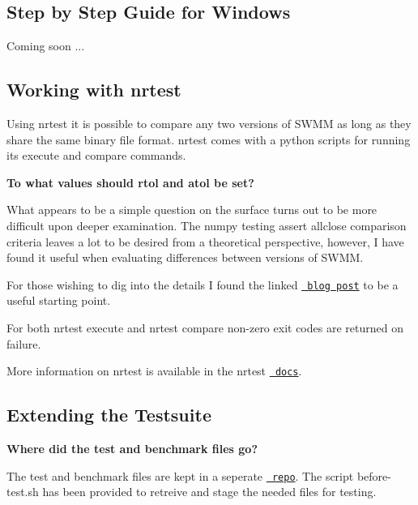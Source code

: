 \subsection*{Step by Step Guide for Windows}

Coming soon ...

\subsection*{Working with nrtest}

Using {\ttfamily nrtest} it is possible to compare any two versions of S\+W\+MM as long as they share the same binary file format. {\ttfamily nrtest} comes with a python scripts for running its {\ttfamily execute} and {\ttfamily compare} commands. 
\begin{DoxyCode}{0}
\end{DoxyCode}


{\bfseries{To what values should rtol and atol be set?}}

What appears to be a simple question on the surface turns out to be more difficult upon deeper examination. The numpy testing assert allclose comparison criteria leaves a lot to be desired from a theoretical perspective, however, I have found it useful when evaluating differences between versions of S\+W\+MM.

For those wishing to dig into the details I found the linked \href{https://randomascii.wordpress.com/2012/02/25/comparing-floating-point-numbers-2012-edition/}{\texttt{ blog post}} to be a useful starting point.

For both nrtest execute and nrtest compare non-\/zero exit codes are returned on failure.

More information on nrtest is available in the nrtest \href{https://nrtest.readthedocs.io/en/latest/}{\texttt{ docs}}.

\subsection*{Extending the Testsuite}

{\bfseries{Where did the test and benchmark files go?}}

The test and benchmark files are kept in a seperate \href{https://github.com/OpenWaterAnalytics/swmm-example-networks}{\texttt{ repo}}. The script before-\/test.\+sh has been provided to retreive and stage the needed files for testing.

